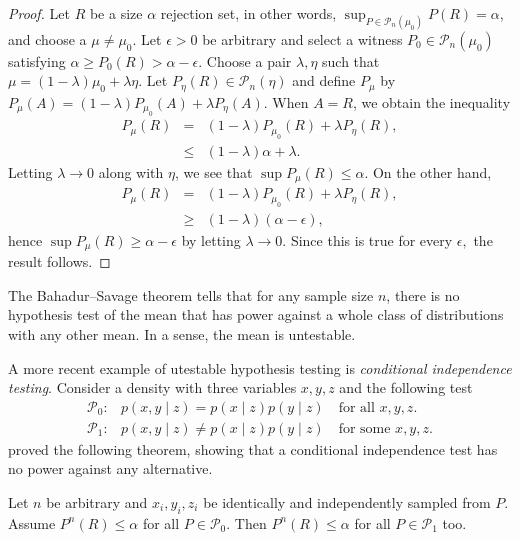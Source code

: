 \begin{proof}
Let $R$ be a size $\alpha$ rejection set, in other words, $\sup_{P\in\mathcal{P}_{n}(\mu_{0})}P(R)=\alpha$,
and choose a $\mu\neq\mu_{0}$. Let $\epsilon>0$ be arbitrary and
select a witness $P_{0}\in\mathcal{P}_{n}(\mu_{0})$ satisfying $\alpha\ge P_{0}(R)>\alpha-\epsilon$.
Choose a pair $\lambda,\eta$ such that $\mu=(1-\lambda)\mu_{0}+\lambda\eta$.
Let $P_{\eta}(R)\in\mathcal{P}_{n}(\eta)$ and define $P_{\mu}$ by
$P_{\mu}(A)=(1-\lambda)P_{\mu_{0}}(A)+\lambda P_{\eta}(A).$ When
$A=R$, we obtain the inequality
\begin{eqnarray*}
P_{\mu}(R) & = & (1-\lambda)P_{\mu_{0}}(R)+\lambda P_{\eta}(R),\\
 & \leq & (1-\lambda)\alpha+\lambda.
\end{eqnarray*}
Letting $\lambda\to0$ along with $\eta$, we see that $\sup P_{\mu}(R)\leq\alpha$.
On the other hand,
\begin{eqnarray*}
P_{\mu}(R) & = & (1-\lambda)P_{\mu_{0}}(R)+\lambda P_{\eta}(R),\\
 & \geq & (1-\lambda)(\alpha-\epsilon),
\end{eqnarray*}
hence $\sup P_{\mu}(R)\geq\alpha-\epsilon$ by letting $\lambda\to0$.
Since this is true for every $\epsilon,$ the result follows.
\end{proof}
The Bahadur--Savage theorem tells that for any sample size $n$, there is no hypothesis test of the mean that has power against a whole class of distributions with any other mean. In a sense, the mean is untestable.

A more recent example of utestable hypothesis testing is \emph{conditional independence testing}. Consider a density with three variables $x,y,z$ and the following test
\begin{align*}
\mathcal{P}_{0}: & p(x,y\mid z)=p(x\mid z)p(y\mid z)\quad\textrm{for all }x,y,z.\\
\mathcal{P}_{1}: & p(x,y\mid z)\neq p(x\mid z)p(y\mid z)\quad\textrm{for some }x,y,z.
\end{align*}
\textcite{Shah2018-jh} proved the following theorem, showing that a
conditional independence test has no power against any alternative. 
\begin{theorem}
\label{theorem:Shah--Peters}Let $n$ be arbitrary and $x_{i},y_{i},z_{i}$ be identically and independently sampled from $P$. Assume $P^{n}(R)\leq\alpha$ for all $P\in\mathcal{P}_{0}$. Then $P^{n}(R)\leq\alpha$ for all $P\in\mathcal{P}_{1}$ too.
\end{theorem}

